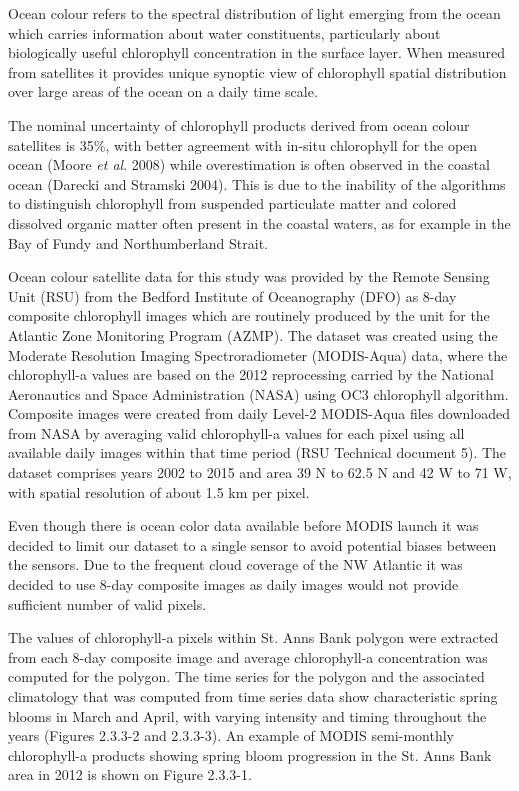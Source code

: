 \documentclass[letterpaper,portrait,11pt]{scrartcl}
\numberwithin{equation}{section}		%
\numberwithin{figure}{section}			%
\numberwithin{table}{section}				%
\begin{document}
Ocean colour refers to the spectral distribution of light emerging from the ocean which carries information about water constituents, particularly about biologically useful chlorophyll concentration in the surface layer. When measured from satellites it provides unique synoptic view of chlorophyll spatial distribution over large areas of the ocean on a daily time scale.

The nominal uncertainty of chlorophyll products derived from ocean colour satellites is 35\%, with better agreement with in-situ chlorophyll for the open ocean (Moore \textit{et al}. 2008) while overestimation is often observed in the coastal ocean (Darecki and Stramski 2004). This is due to the inability of the algorithms to distinguish chlorophyll from suspended particulate matter and colored dissolved organic matter often present in the coastal waters, as for example in the Bay of Fundy and Northumberland Strait.

Ocean colour satellite data for this study was provided by the Remote Sensing Unit (RSU) from the Bedford Institute of Oceanography (DFO) as 8-day composite chlorophyll images which are routinely produced by the unit for the Atlantic Zone Monitoring Program (AZMP). The dataset was created using the Moderate Resolution Imaging Spectroradiometer (MODIS-Aqua) data, where the chlorophyll-a values are based on the 2012 reprocessing carried by the National Aeronautics and Space Administration (NASA) using OC3 chlorophyll algorithm. Composite images were created from daily Level-2 MODIS-Aqua files downloaded from NASA by averaging valid chlorophyll-a values for each pixel using all available daily images within that time period (RSU Technical document 5). The dataset comprises years 2002 to 2015 and area 39 N to 62.5 N and 42 W to 71 W, with spatial resolution of about 1.5 km per pixel. 

Even though there is ocean color data available before MODIS launch it was decided to limit our dataset to a single sensor to avoid potential biases between the sensors. Due to the frequent cloud coverage of the NW Atlantic it was decided to use 8-day composite images as daily images would not provide sufficient number of valid pixels. 

The values of chlorophyll-a pixels within St. Anns Bank polygon were extracted from each 8-day composite image and average chlorophyll-a concentration was computed for the polygon. The time series for the polygon and the associated climatology that was computed from time series data show characteristic spring blooms in March and April, with varying intensity and timing throughout the years (Figures 2.3.3-2 and 2.3.3-3). An example of MODIS semi-monthly chlorophyll-a products showing spring bloom progression in the St. Anns Bank area in 2012 is shown on Figure 2.3.3-1.
\end{document}
